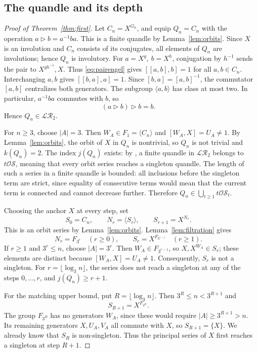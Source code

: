 \documentclass[11pt,a4paper]{article}
\theoremstyle{definition}
\theoremstyle{remark}
\newcommand{\LR}{\mathcal{LR}}
\newcommand{\tOS}{t\mathcal{OS}}
\newcommand{\conj}{\triangleright}
\begin{document}
\subsection{The quandle and its depth}

\begin{proof}[Proof of Theorem~\ref{thm:first}]
Let \(C_n=X^{G_n}\), and equip \(Q_n=C_n\)
with the operation \(a\conj b=a^{-1}ba\).
This is a finite quandle by Lemma~\ref{lem:orbits}.
Since \(X\) is an involution and \(C_n\) consists of its conjugates,
all elements of \(Q_n\) are involutions; hence \(Q_n\) is involutory.
For \(a=X^g,\ b=X^h\), conjugation by \(h^{-1}\)
sends the pair to \(X^{gh^{-1}},X\).
Thus \eqref{eq:pairengel} gives
\([[a,b],b]=1\) for all \(a,b\in C_n\).
Interchanging \(a,b\) gives \([[b,a],a]=1\).
Since \([b,a]=[a,b]^{-1}\), the commutator \([a,b]\)
centralizes both generators. The subgroup \(\langle a,b\rangle\)
has class at most two.
In particular, \(a^{-1}ba\) commutes with \(b\), so
\[
 (a\conj b)\conj b=b.
\]
Hence \(Q_n\in\LR_2\).

For \(n\ge3\), choose \(|A|=3\).
Then \(W_A\in F_1=\langle C_n\rangle\)
and \([W_A,X]=U_A\ne1\).
By Lemma~\ref{lem:orbits}, the orbit of \(X\) in \(Q_n\)
is nontrivial, so \(Q_n\) is not trivial and \(k(Q_n)=2\).
The index \(j(Q_n)\) exists:
by \cite[Corollary~5.19]{BCNW}, a finite quandle in \(\LR_2\)
belongs to \(\tOS\), meaning that every orbit series
reaches a singleton quandle.
The length of such a series in a finite quandle is bounded:
all inclusions before the singleton term are strict,
since equality of consecutive terms would mean that
the current term is connected and cannot decrease further.
Therefore \(Q_n\in\bigcup_{t\ge1}\tOS_t\).

Choosing the anchor \(X\) at every step, set
\[
 S_0=C_n,\qquad N_r=\langle S_r\rangle,\qquad
 S_{r+1}=X^{N_r}.
\]
This is an orbit series by Lemma~\ref{lem:orbits}.
Lemma~\ref{lem:filtration} gives
\[
 N_r=F_{3^r}\quad(r\ge0),\qquad
 S_r=X^{F_{3^{r-1}}}\quad(r\ge1).
\]
If \(r\ge1\) and \(3^r\le n\), choose \(|A|=3^r\).
Then \(W_A\in F_{3^{r-1}}\), so \(X,X^{W_A}\in S_r\);
these elements are distinct because \([W_A,X]=U_A\ne1\).
Consequently, \(S_r\) is not a singleton.
For \(r=\lfloor\log_3n\rfloor\), the series does not reach
a singleton at any of the steps \(0,\ldots,r\),
and \(j(Q_n)\ge r+1\).

For the matching upper bound, put \(R=\lfloor\log_3n\rfloor\).
Then \(3^R\le n<3^{R+1}\) and
\[
S_{R+1}=X^{F_{3^R}}.
\]
The group \(F_{3^R}\) has no generators \(W_A\), since these would require
\(|A|\ge3^{R+1}>n\). Its remaining generators \(X,U_A,V_A\)
all commute with \(X\), so \(S_{R+1}=\{X\}\). We already know
that \(S_R\) is non-singleton. Thus the principal series of \(X\)
first reaches a singleton at step \(R+1\).


\end{proof}
\end{document}
